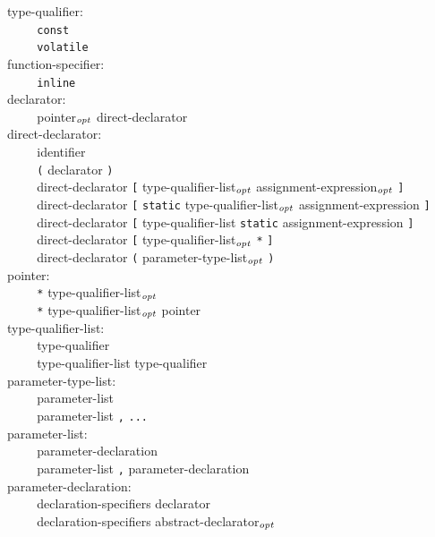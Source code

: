 \documentclass[12pt]{report}
\def\|{\verb|}
\newcommand\opt{$_{{\it opt}}$ }
\begin{document}
\noindent
type-qualifier:\\
\|    | \verb+const+\\
\|    | \verb+volatile+\\

\noindent
function-specifier:\\
\|    | \verb+inline+\\

\noindent
declarator:\\
\|    | pointer\opt direct-declarator\\

\noindent
direct-declarator:\\
\|    | identifier\\
\|    | \verb+(+ declarator \verb+)+\\
\|    | direct-declarator \verb+[+ type-qualifier-list\opt assignment-expression\opt \verb+]+\\
\|    | direct-declarator \verb+[+ \verb+static+ type-qualifier-list\opt assignment-expression \verb+]+\\
\|    | direct-declarator \verb+[+ type-qualifier-list \verb+static+ assignment-expression \verb+]+\\
\|    | direct-declarator \verb+[+ type-qualifier-list\opt \verb+*+ \verb+]+\\
\|    | direct-declarator \verb+(+ parameter-type-list\opt \verb+)+\\

\noindent
pointer:\\
\|    | \verb+*+ type-qualifier-list\opt\\
\|    | \verb+*+ type-qualifier-list\opt pointer\\

\noindent
type-qualifier-list:\\
\|    | type-qualifier\\
\|    | type-qualifier-list type-qualifier\\

\noindent
parameter-type-list:\\
\|    | parameter-list\\
\|    | parameter-list \verb+,+ \verb+...+\\

\noindent
parameter-list:\\
\|    | parameter-declaration\\
\|    | parameter-list \verb+,+ parameter-declaration\\

\noindent
parameter-declaration:\\
\|    | declaration-specifiers declarator\\
\|    | declaration-specifiers abstract-declarator\opt\\
\end{document}
